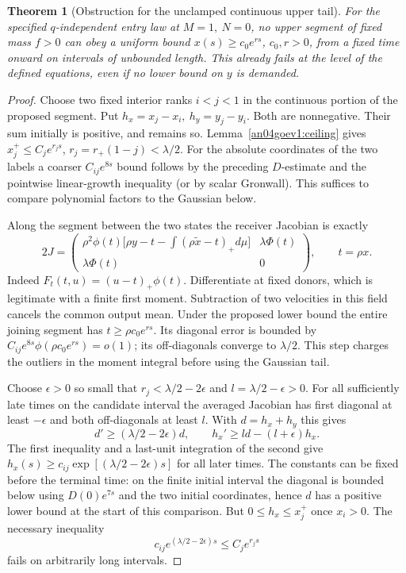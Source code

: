 \documentclass[11pt]{article}
\newtheorem{theorem}{Theorem}\newtheorem{lemma}{Lemma}
\begin{document}
\begin{theorem}[Obstruction for the unclamped continuous upper tail]
\label{an04goev1:gap}
For the specified \(q\)-independent entry law at \(M=1,\ N=0\),
no upper segment of fixed mass \(f>0\) can obey a uniform bound
\(x(s)\ge c_0 e^{rs}\), \(c_0,r>0\), from a fixed time onward on
intervals of unbounded length. This already fails at the level of
the defined equations, even if no lower bound on \(y\) is demanded.
\end{theorem}
\begin{proof}
Choose two fixed interior ranks \(i<j<1\) in the continuous portion
of the proposed segment. Put \(h_x=x_j-x_i,\ h_y=y_j-y_i\).
Both are nonnegative. Their sum initially is positive, and remains so.
Lemma~\ref{an04goev1:ceiling} gives \(x_j^+\le C_j e^{r_js}\),
\(r_j=r_+(1-j)<\lambda/2\).
For the absolute coordinates of the two labels a coarser
\(C_{ij}e^{8s}\) bound follows by the preceding \(D\)-estimate and
the pointwise linear-growth inequality (or by scalar Gronwall).
This suffices to compare polynomial factors to the Gaussian below.

Along the segment between the two states the receiver Jacobian is exactly
\[
 2J=\begin{pmatrix}
 \rho^2\phi(t)\big[\rho y-t-\int(\rho\tilde x-t)_+d\mu\big]
       &\lambda\Phi(t)\\
 \lambda\Phi(t)&0
 \end{pmatrix},\qquad t=\rho x .
\]
Indeed \(F_t(t,u)=(u-t)_+\phi(t)\). Differentiate at fixed
donors, which is legitimate with a finite first moment. Subtraction
of two velocities in this field cancels the common output mean.
Under the proposed lower bound the entire joining segment has
\(t\ge\rho c_0 e^{rs}\). Its diagonal error is bounded by
\(C_{ij}e^{8s}\phi(\rho c_0e^{rs})=o(1)\);
its off-diagonals converge to \(\lambda/2\). This step charges
the outliers in the moment integral before using the Gaussian tail.

Choose \(\epsilon>0\) so small that \(r_j<\lambda/2-2\epsilon\)
and \(l=\lambda/2-\epsilon>0\).
For all sufficiently late times on the candidate interval the
averaged Jacobian has first diagonal at least \(-\epsilon\)
and both off-diagonals at least \(l\). With \(d=h_x+h_y\) this gives
\[
 d'\ge(\lambda/2-2\epsilon)d,\qquad
 h_x'\ge l d-(l+\epsilon)h_x .
\]
The first inequality and a last-unit integration of the second give
\(h_x(s)\ge c_{ij}\exp[(\lambda/2-2\epsilon)s]\) for all later
times. The constants can be fixed before the terminal time:
on the finite initial interval the diagonal is bounded below using
\(D(0)e^{7s}\) and the two initial coordinates, hence \(d\)
has a positive lower bound at the start of this comparison.
But \(0\le h_x\le x_j^+\) once \(x_i>0\).
The necessary inequality
\begin{equation}\label{an04goev1:failure}
 c_{ij}e^{(\lambda/2-2\epsilon)s}\le C_j e^{r_js}
\end{equation}
fails on arbitrarily long intervals.
\end{proof}
\end{document}
